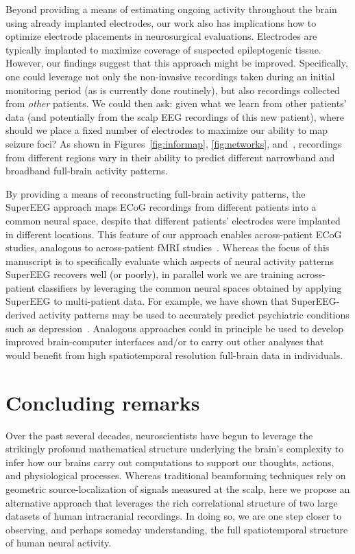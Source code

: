 \documentclass[11pt]{article}
\begin{document}
Beyond providing a means of estimating ongoing activity throughout the brain
using already implanted electrodes, our work also has implications how to
optimize electrode placements in neurosurgical evaluations. Electrodes are
typically implanted to maximize coverage of suspected epileptogenic tissue.
However, our findings suggest that this approach might be improved.
Specifically, one could leverage not only the non-invasive recordings taken
during an initial monitoring period (as is currently done routinely), but also
recordings collected from \textit{other} patients.  We could then ask: given
what we learn from other patients' data (and potentially from the scalp EEG
recordings of this new patient), where should we place a fixed number of
electrodes to maximize our ability to map seizure foci?  As shown in
Figures~\ref{fig:informap}, \ref{fig:networks}, and~\intersectmap, recordings
from different regions vary in their ability to predict different narrowband and
broadband full-brain activity patterns.

By providing a means of reconstructing full-brain activity patterns, the
SuperEEG approach maps ECoG recordings from different patients into a common
neural space, despite that different patients' electrodes were implanted in
different locations. This feature of our approach enables across-patient ECoG
studies, analogous to across-patient fMRI studies~\citep[e.g.,][]{HaxbEtal01,
NormEtal06, HaxbEtal11}. Whereas the focus of this manuscript is to specifically
evaluate which aspects of neural activity patterns SuperEEG recovers well (or
poorly), in parallel work we are training across-patient classifiers by
leveraging the common neural spaces obtained by applying SuperEEG to
multi-patient data.  For example, we have shown that SuperEEG-derived activity
patterns may be used to accurately predict psychiatric conditions such as
depression~\citep{ScanEtal20}.  Analogous approaches could in principle be used
to develop improved brain-computer interfaces and/or to carry out other analyses
that would benefit from high spatiotemporal resolution full-brain data in
individuals.


\section*{Concluding remarks}
Over the past several decades, neuroscientists
have begun to leverage the strikingly profound mathematical structure underlying
the brain's complexity to infer how our brains carry out computations to support
our thoughts, actions, and physiological processes.  Whereas traditional
beamforming techniques rely on geometric source-localization of signals measured
at the scalp, here we propose an alternative approach that leverages the rich
correlational structure of two large datasets of human intracranial recordings.
In doing so, we are one step closer to observing, and perhaps someday
understanding, the full spatiotemporal structure of human neural activity.
\end{document}
